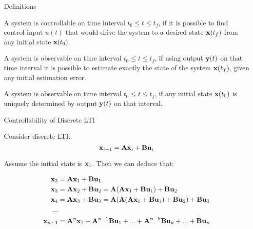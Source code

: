 \documentclass{beamer}
\begin{document}
\begin{frame}{Definitions}
	\begin{flushleft}
		
		\begin{definition}[Controllability]
			A system is controllable on time interval $t_0 \leq t \leq t_f$, if it is possible to find control input $u(t)$ that would drive the system to a desired state $\mathbf{x}(t_f)$ from any initial state $\mathbf{x}(t_0)$.
		\end{definition}
		
		\begin{definition}[Observability]
			A system is observable on time interval $t_0 \leq t \leq t_f$, if using output $\mathbf{y}(t)$ on that time interval it is possible to estimate exactly the state of the system $\mathbf{x}(t_f)$, given any initial estimation error.
		\end{definition}
	
		\begin{definition}
				A system is observable on time interval $t_0 \leq t \leq t_f$, if any initial state $\mathbf{x}(t_0)$ is uniquely determined by output $\mathbf{y}(t)$ on that interval.
		\end{definition}
		
	\end{flushleft}
\end{frame}





\begin{frame}{Controllability of Discrete LTI}
\begin{flushleft}

Consider discrete LTI:
\begin{equation}
\mathbf{x}_{i+1} = \mathbf{A}  \mathbf{x}_i + \mathbf{B} \mathbf{u}_i
\end{equation}

Assume the initial state is $\mathbf{x}_1$. Then we can deduce that:

\begin{align*}
\mathbf{x}_2 &= \mathbf{A} \mathbf{x}_1 + \mathbf{B} \mathbf{u}_1 \\
\mathbf{x}_3 &= \mathbf{A} \mathbf{x}_2 + \mathbf{B} \mathbf{u}_2 = \mathbf{A} (\mathbf{A} \mathbf{x}_1 + \mathbf{B} \mathbf{u}_1) + \mathbf{B} \mathbf{u}_2 \\
\mathbf{x}_4 &= \mathbf{A} \mathbf{x}_3 + \mathbf{B} \mathbf{u}_3 = \mathbf{A} (\mathbf{A} (\mathbf{A} \mathbf{x}_1 + \mathbf{B} \mathbf{u}_1) + \mathbf{B} \mathbf{u}_2) + \mathbf{B} \mathbf{u}_3 \\
... \\
\mathbf{x}_{n+1} &= \mathbf{A}^n \mathbf{x}_1 + \mathbf{A}^{n-1} \mathbf{B} \mathbf{u}_1 + ... + 
\mathbf{A}^{n - k} \mathbf{B} \mathbf{u}_{k} + ... + 
\mathbf{B} \mathbf{u}_n
\end{align*}

\end{flushleft}
\end{frame}
\end{document}
